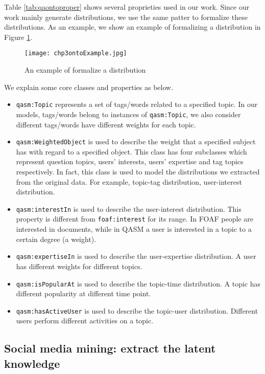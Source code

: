 Table \ref{tab:qaontoproper} shows several proprieties used in our work. Since our work mainly generate distributions, we use the same patter to formalize these distributions. As an example, we show an example of formalizing a distribution in Figure \ref{fig:chp3ontoexample}. 

\begin{figure}%
\centering
\texttt{[image: chp3ontoExample.jpg]}  
\caption{An example of formalize a distribution}
\label{fig:chp3ontoexample} 
\end{figure}

We explain some core classes and properties as below.

\begin{itemize}
\item \texttt{qasm:Topic} represents a set of tags/words related to a specified topic.
In our models, tags/words belong to instances of \texttt{qasm:Topic}, we also consider different tags/words have different weights for each topic.
\item \texttt{qasm:WeightedObject} is used to describe the weight that a specified subject has with regard to a specified object. This class has four subclasses which represent question topics, users' interests, users' expertise and tag topics respectively. In fact, this class is used to model the distributions we extracted from the original data. For example, topic-tag distribution, user-interest distribution.
\item \texttt{qasm:interestIn} is used to describe the user-interest distribution. This property is different from \texttt{foaf:interest} for its range. In FOAF people are interested in documents, while in QASM a user is interested in a topic to a certain degree (a weight).
\item \texttt{qasm:expertiseIn} is used to describe the user-expertise distribution. A user has different weights for different topics.
\item \texttt{qasm:isPopularAt} is used to describe the topic-time distribution. A topic has different popularity at different time point.
\item \texttt{qasm:hasActiveUser} is used to describe the topic-user distribution. Different users perform different activities on a topic.
\end{itemize}



\subsection{Social media mining: extract the latent knowledge}

